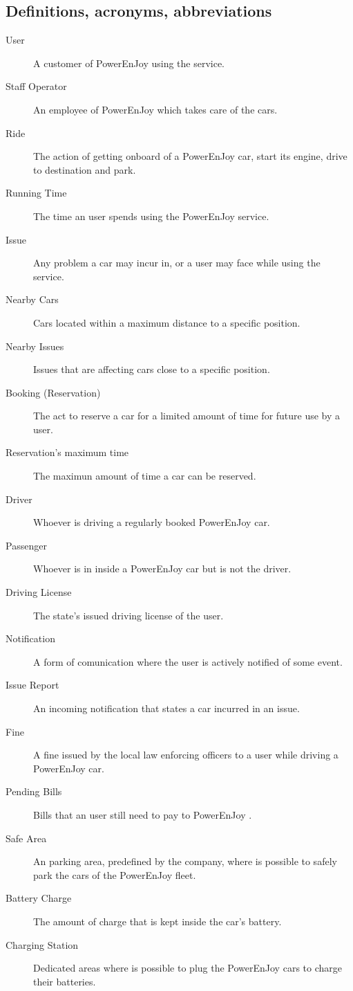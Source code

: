 \documentclass[11pt]{article} %
\newcommand{\pe}{PowerEnJoy }
\begin{document}
\subsection{Definitions, acronyms, abbreviations}
  \begin{description}
	\item[User] A customer of \pe using the service.
	\item[Staff Operator] An employee of \pe which takes care of the cars.
	\item[Ride] The action of getting onboard of a \pe car, start its engine, drive to destination and park.
  	\item[Running Time] The time an user spends using the \pe service.
	\item[Issue] Any problem a car may incur in, or a user may face while using the service.
	\item[Nearby Cars] Cars located within a maximum distance to a specific position.
	\item[Nearby Issues] Issues that are affecting cars close to a specific position.
	\item[Booking (Reservation)] The act to reserve a car for a limited amount of time for future use by a user.
	\item[Reservation's maximum time] The maximun amount of time a car can be reserved.
	\item[Driver] Whoever is driving a regularly booked \pe car.
	\item[Passenger] Whoever is in inside a \pe car but is not the driver.
	\item[Driving License] The state's issued driving license of the user.
	\item[Notification] A form of comunication where the user is actively notified of some event.
	\item[Issue Report] An incoming notification that states a car incurred in an issue.
	\item[Fine] A fine issued by the local law enforcing officers to a user while driving a \pe car. 
	\item[Pending Bills] Bills that an user still need to pay to \pe.
	\item[Safe Area] An parking area, predefined by the company, where is possible to safely park the cars of the \pe fleet.
	\item[Battery Charge] The amount of charge that is kept inside the car's battery.
	\item[Charging Station] Dedicated areas where is possible to plug the \pe cars to charge their batteries.

\end{description}
\end{document}
